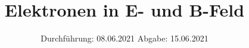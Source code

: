 

\subject{V501/2}
\title{Elektronen in E- und B-Feld}
\date{%
  Durchführung: 08.06.2021
  \hspace{3em}
  Abgabe: 15.06.2021
}



\maketitle
\thispagestyle{empty}
\tableofcontents
\newpage







\printbibliography{}


